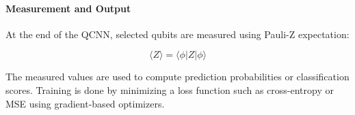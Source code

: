 \documentclass[conference]{IEEEtran}
\begin{document}
\paragraph{Measurement and Output}

At the end of the QCNN, selected qubits are measured using Pauli-Z expectation:

\begin{equation}
    \langle Z \rangle = \langle \phi | Z | \phi \rangle
\end{equation}

The measured values are used to compute prediction probabilities or classification scores. Training is done by minimizing a loss function such as cross-entropy or MSE using gradient-based optimizers.



\end{document}
